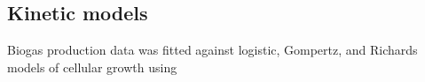 \subsection{Kinetic models}
Biogas production data was fitted against logistic, Gompertz, and
Richards models of cellular growth using  